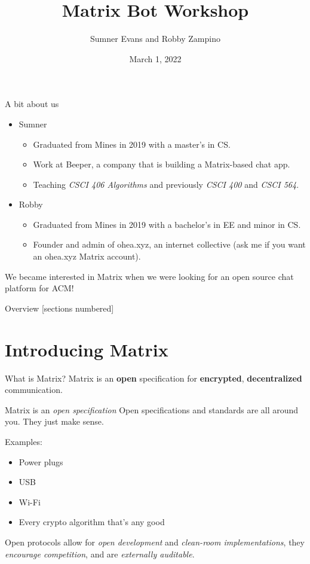 \documentclass{acm}
\title{Matrix Bot Workshop}
\author{Sumner Evans and Robby Zampino}
\date{March 1, 2022}
\begin{document}
\begin{frame}{A bit about us}
    \begin{itemize}
        \item Sumner
            \begin{itemize}
                \item Graduated from Mines in 2019 with a master's in CS.
                \item Work at Beeper, a company that is building a Matrix-based
                    chat app.
                \item Teaching \textit{CSCI 406 Algorithms} and previously
                    \textit{CSCI 400} and \textit{CSCI 564}.
            \end{itemize}

        \item Robby
            \begin{itemize}
                \item Graduated from Mines in 2019 with a bachelor's in EE and
                    minor in CS.
              \item Founder and admin of ohea.xyz, an internet collective
                    (ask me if you want an ohea.xyz Matrix account).
            \end{itemize}
    \end{itemize}

    We became interested in Matrix when we were looking for an open source chat
    platform for ACM!
\end{frame}

\begin{frame}{Overview}
    [sections numbered]
    \tableofcontents[hideallsubsections]
\end{frame}

\section{Introducing Matrix}

\begin{frame}{What is Matrix?}
    Matrix is an \textbf{open} specification for \textbf{encrypted},
    \textbf{decentralized} communication.
\end{frame}

\begin{frame}{Matrix is an \textit{open specification}}
    Open specifications and standards are all around you. They just make
    sense\texttrademark.

    Examples:\pause
    \begin{itemize}
        \item Power plugs
        \item USB
        \item Wi-Fi
        \item Every crypto algorithm that's any good
    \end{itemize}
    \pause

    Open protocols allow for \textit{open development} and  \textit{clean-room
    implementations}, they \textit{encourage competition}, and are
    \textit{externally auditable}.
\end{frame}
\end{document}
